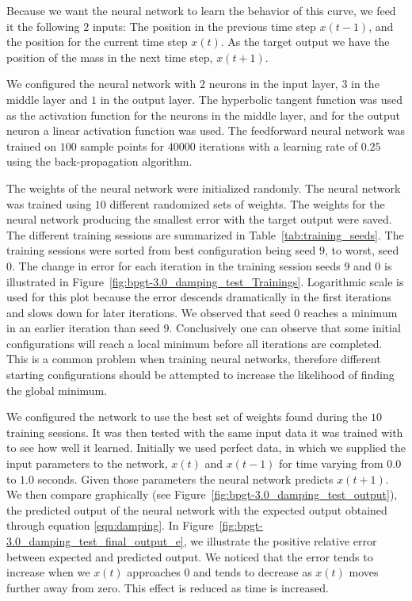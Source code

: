 \documentclass[11pt]{article}
\begin{document}
Because we want the neural network to learn the behavior of this curve, we feed it the following $2$ inputs: The position in the
previous time step $x(t-1)$, and the position for the current time step $x(t)$. As the target output we have the position of the mass in
the next time step, $x(t+1)$.

We configured the neural network with $2$ neurons in the input layer, $3$ in the middle layer and $1$ in the output layer. The
hyperbolic tangent function was used as the activation function for the neurons in the middle layer, and for the output neuron a linear
activation function was used. The feedforward neural network was trained on $100$ sample points for $40000$ iterations with a learning
rate of $0.25$ using the back-propagation algorithm.


The weights of the neural network were initialized randomly. The neural network was trained using $10$ different randomized sets of
weights. The weights for the neural network producing the smallest error with the target output were saved. The different training
sessions are summarized in Table~\ref{tab:training_seeds}. The training sessions were sorted from best configuration being seed $9$, to
worst, seed $0$. The change in error for each iteration in the training session seeds $9$ and $0$ is illustrated in
Figure~\ref{fig:bpgt-3.0_damping_test_Trainings}. Logarithmic scale is used for this plot because the error descends dramatically in the
first iterations and slows down for later iterations. We observed that seed $0$ reaches a minimum in an earlier iteration than seed $9$.
Conclusively one can observe that some initial configurations will reach a local minimum before all iterations are completed. This is a
common problem when training neural networks, therefore different starting configurations should be attempted to increase the likelihood
of finding the global minimum.

We configured the network to use the best set of weights found during the $10$ training sessions. It was then tested with the same input
data it was trained with to see how well it learned. Initially we used perfect data, in which we supplied the input parameters to the
network, $x(t)$ and $x(t-1)$ for time varying from $0.0$ to $1.0$ seconds. Given those parameters the neural network predicts $x(t+1)$.
We then compare graphically (see Figure~\ref{fig:bpgt-3.0_damping_test_output}), the predicted output of the neural network with the
expected output obtained through equation \ref{eqn:damping}. In Figure~\ref{fig:bpgt-3.0_damping_test_final_output_e}, we illustrate the
positive relative error between expected and predicted output. We noticed that the error tends to increase when we $x(t)$ approaches
$0$ and tends to decrease as $x(t)$ moves further away from zero. This effect is reduced as time is increased.
\end{document}
